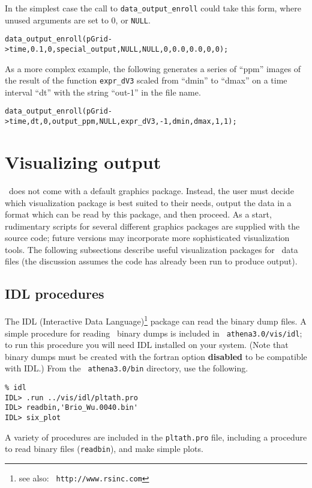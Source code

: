 In the simplest case the call to {\tt data\_output\_enroll} could take 
this form, where unused arguments are set to 0, or {\tt NULL}.
\footnotesize
\begin{verbatim}
data_output_enroll(pGrid->time,0.1,0,special_output,NULL,NULL,0,0.0,0.0,0,0);
\end{verbatim}
\normalsize
As a more complex example, the following generates a series of ``ppm''
images of the result of the function {\tt expr\_dV3} scaled from
``dmin'' to ``dmax'' on a time interval ``dt'' with the string
``out-1'' in the file name.
\footnotesize
\begin{verbatim}
data_output_enroll(pGrid->time,dt,0,output_ppm,NULL,expr_dV3,-1,dmin,dmax,1,1);
\end{verbatim}
\normalsize

\section{Visualizing output}

\ath\ does not come with a default graphics package.  Instead, the user must
decide which visualization package is best suited to their needs, output the
data in a format which can be read by this package, and then proceed.
As a start, rudimentary
scripts for several different graphics packages are supplied with the source
code; future versions may incorporate more sophisticated visualization
tools.  The following subsections describe useful visualization packages for
\ath\ data files (the discussion assumes the code has already been run to
produce output).

\subsection{IDL procedures}

The IDL (Interactive Data Language)\footnote{see also: {\tt
http://www.rsinc.com}} package can read the binary dump files.
A simple procedure for reading \ath\ binary dumps is included in {\tt
athena3.0/vis/idl}; to run this procedure you will need IDL installed on
your system.  (Note that binary dumps must be created with the fortran
option {\bf disabled} to be compatible with IDL.)  From the {\tt
athena3.0/bin} directory, use the following.
\footnotesize
\begin{verbatim}
% idl
IDL> .run ../vis/idl/pltath.pro 
IDL> readbin,'Brio_Wu.0040.bin'
IDL> six_plot
\end{verbatim}
\normalsize
A variety of procedures are included in the {\tt pltath.pro} file, including 
a procedure to read binary files ({\tt readbin}), and make simple plots.

